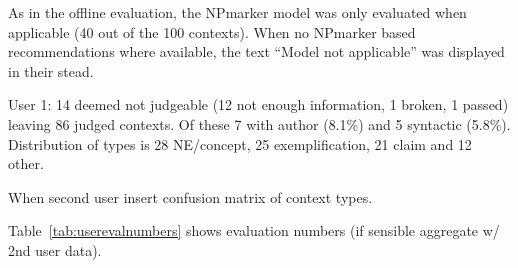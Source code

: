 As in the offline evaluation, the NPmarker model was only evaluated when applicable (40 out of the 100 contexts). When no NPmarker based recommendations where available, the text ``Model not applicable'' was displayed in their stead.

User 1: 14 deemed not judgeable (12 not enough information, 1 broken, 1 passed) leaving 86 judged contexts. Of these 7 with author (8.1\%) and 5 syntactic (5.8\%). Distribution of types is 28 NE/concept, 25 exemplification, 21 claim and 12 other.

When second user insert confusion matrix of context types.

Table~\ref{tab:userevalnumbers} shows evaluation numbers (if sensible aggregate w/ 2nd user data).

